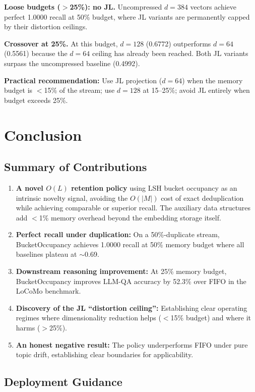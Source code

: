 \documentclass[conference]{IEEEtran}
\begin{document}
\textbf{Loose budgets ($>$25\%): no JL.}
Uncompressed $d{=}384$ vectors achieve perfect 1.0000 recall at 50\%
budget, where JL variants are permanently capped by their distortion
ceilings.

\textbf{Crossover at 25\%.}
At this budget, $d{=}128$ (0.6772) outperforms $d{=}64$ (0.5561)
because the $d{=}64$ ceiling has already been reached. Both JL
variants surpass the uncompressed baseline (0.4992).

\textbf{Practical recommendation:} Use JL projection ($d{=}64$) when
the memory budget is $<$15\% of the stream; use $d{=}128$ at 15--25\%;
avoid JL entirely when budget exceeds 25\%.

\section{Conclusion}

\subsection{Summary of Contributions}
\begin{enumerate}
\item \textbf{A novel $O(L)$ retention policy} using LSH bucket
      occupancy as an intrinsic novelty signal, avoiding the $O(|M|)$
      cost of exact deduplication while achieving comparable or superior
      recall. The auxiliary data structures add $<$1\% memory overhead
      beyond the embedding storage itself.
\item \textbf{Perfect recall under duplication:} On a 50\%-duplicate
      stream, BucketOccupancy achieves 1.0000 recall at 50\% memory
      budget where all baselines plateau at $\sim$0.69.
\item \textbf{Downstream reasoning improvement:} At 25\% memory budget,
      BucketOccupancy improves LLM-QA accuracy by 52.3\% over FIFO in
      the LoCoMo benchmark.
\item \textbf{Discovery of the JL ``distortion ceiling'':} Establishing
      clear operating regimes where dimensionality reduction helps
      ($<$15\% budget) and where it harms ($>$25\%).
\item \textbf{An honest negative result:} The policy underperforms FIFO
      under pure topic drift, establishing clear boundaries for
      applicability.
\end{enumerate}

\subsection{Deployment Guidance}
\end{document}
